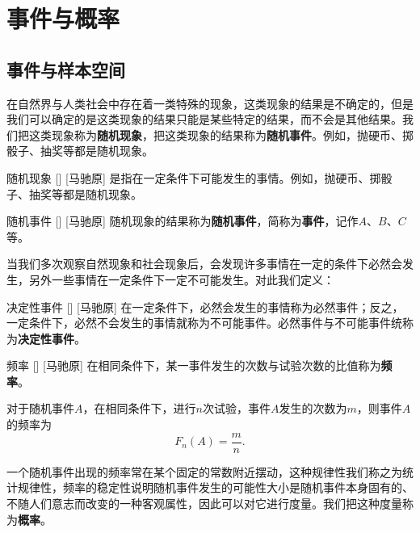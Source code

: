 \documentclass[UTF8]{ctexart}
\begin{document}
\tableofcontents
\newpage

\section{事件与概率}

    \subsection{事件与样本空间}

        在自然界与人类社会中存在着一类特殊的现象，这类现象的结果是不确定的，但是我们可以确定的是这类现象的结果只能是某些特定的结果，而不会是其他结果。我们把这类现象称为\textbf{随机现象}，把这类现象的结果称为\textbf{随机事件}。例如，抛硬币、掷骰子、抽奖等都是随机现象。

        \begin{dfn}
            []
            {随机现象}
            []
            [马驰原]
            是指在一定条件下可能发生的事情。例如，抛硬币、掷骰子、抽奖等都是随机现象。
        \end{dfn}

        \begin{dfn}
            []
            {随机事件}
            []
            [马驰原]
            随机现象的结果称为\textbf{随机事件}，简称为\textbf{事件}，记作$A$、$B$、$C$等。
        \end{dfn}

        当我们多次观察自然现象和社会现象后，会发现许多事情在一定的条件下必然会发生，另外一些事情在一定条件下一定不可能发生。对此我们定义：

        \begin{dfn}
            []
            {决定性事件}
            []
            [马驰原]
            在一定条件下，必然会发生的事情称为必然事件；反之，一定条件下，必然不会发生的事情就称为不可能事件。必然事件与不可能事件统称为\textbf{决定性事件}。
        \end{dfn}

        \begin{dfn}
            []
            {频率}
            []
            [马驰原]
            在相同条件下，某一事件发生的次数与试验次数的比值称为\textbf{频率}。

            对于随机事件$A$，在相同条件下，进行$n$次试验，事件$A$发生的次数为$m$，则事件$A$的频率为\[F_n(A)=\frac{m}{n}.\]
        \end{dfn}

        一个随机事件出现的频率常在某个固定的常数附近摆动，这种规律性我们称之为统计规律性，频率的稳定性说明随机事件发生的可能性大小是随机事件本身固有的、不随人们意志而改变的一种客观属性，因此可以对它进行度量。我们把这种度量称为\textbf{概率}。
\end{document}
